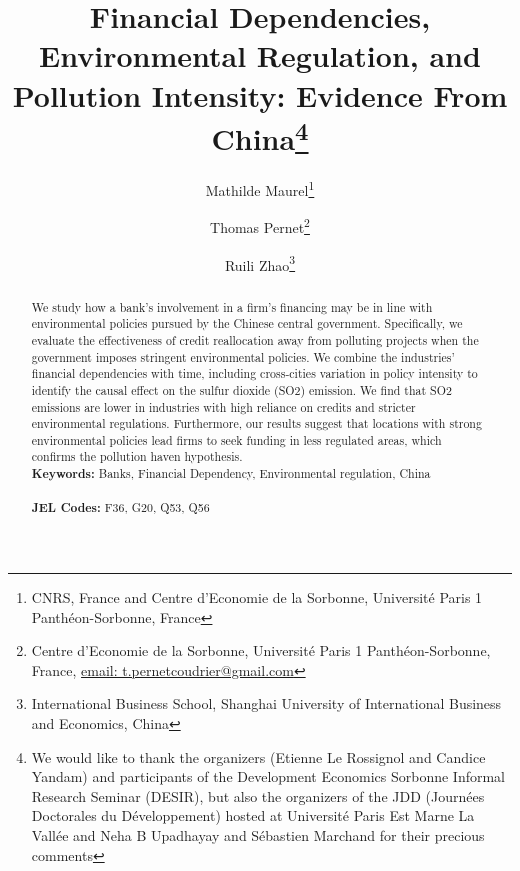 \documentclass[12pt]{article}
\begin{document}
\begin{titlepage}

\title{Financial Dependencies, Environmental Regulation, and Pollution Intensity: Evidence From China\thanks{We would like to thank the organizers (Etienne Le Rossignol and Candice Yandam) and participants of the Development Economics Sorbonne Informal Research Seminar (DESIR), but also the organizers of the JDD (Journées Doctorales du Développement) hosted at Université Paris Est Marne La Vallée and Neha B Upadhayay and Sébastien Marchand for their precious comments}}
\author{
Mathilde Maurel\thanks{CNRS, France and Centre d'Economie de la Sorbonne, Université Paris 1 Panthéon-Sorbonne, France} 
\and Thomas Pernet\thanks{Centre d'Economie de la Sorbonne, Université Paris 1 Panthéon-Sorbonne, France,
\href{mailto:t.pernetcoudrier@gmail.com}{email: t.pernetcoudrier@gmail.com} 
}
\and Ruili Zhao\thanks{International Business School, Shanghai University of International Business and Economics, China}
}

\date{}

\maketitle
\begin{abstract}
\noindent We study how a bank’s involvement in a firm's financing may be in line with environmental policies pursued by the Chinese central government. Specifically, we evaluate the effectiveness of credit reallocation away from polluting projects when the government imposes stringent environmental policies. We combine the industries' financial dependencies with time, including cross-cities variation in policy intensity to identify the causal effect on the sulfur dioxide (SO2) emission. We find that SO2 emissions are lower in industries with high reliance on credits and stricter environmental regulations. Furthermore, our results suggest that locations with strong environmental policies lead firms to seek funding in less regulated areas, which confirms the pollution haven hypothesis.
\vspace{0em}\\
\noindent\textbf{Keywords:} Banks, Financial Dependency, Environmental regulation, China\\
\vspace{0em}\\
\noindent\textbf{JEL Codes:} F36, G20, Q53, Q56\\

\bigskip
\end{abstract}
\setcounter{page}{0}
\thispagestyle{empty}
\end{titlepage}
\pagebreak \newpage
\end{document}
